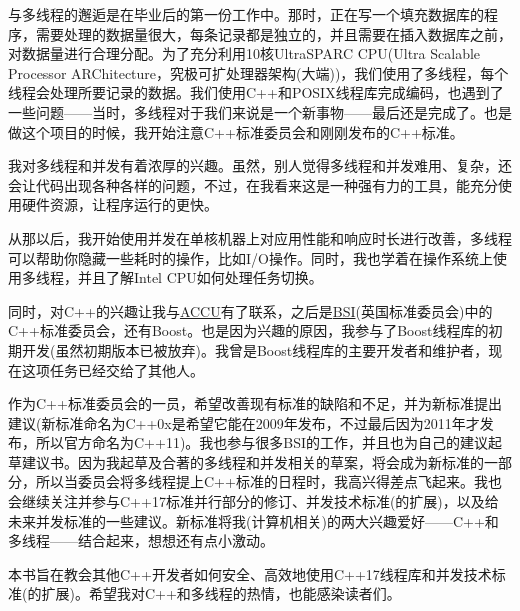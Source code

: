 
与多线程的邂逅是在毕业后的第一份工作中。那时，正在写一个填充数据库的程序，需要处理的数据量很大，每条记录都是独立的，并且需要在插入数据库之前，对数据量进行合理分配。为了充分利用10核UltraSPARC CPU(Ultra Scalable Processor ARChitecture，究极可扩处理器架构(大端))，我们使用了多线程，每个线程会处理所要记录的数据。我们使用C++和POSIX线程库完成编码，也遇到了一些问题——当时，多线程对于我们来说是一个新事物——最后还是完成了。也是做这个项目的时候，我开始注意C++标准委员会和刚刚发布的C++标准。

我对多线程和并发有着浓厚的兴趣。虽然，别人觉得多线程和并发难用、复杂，还会让代码出现各种各样的问题，不过，在我看来这是一种强有力的工具，能充分使用硬件资源，让程序运行的更快。

从那以后，我开始使用并发在单核机器上对应用性能和响应时长进行改善，多线程可以帮助你隐藏一些耗时的操作，比如I/O操作。同时，我也学着在操作系统上使用多线程，并且了解Intel CPU如何处理任务切换。

同时，对C++的兴趣让我与\href{http://accu.org/}{ACCU}有了联系，之后是\href{http://www.bsigroup.com/en-GB/standards/}{BSI}(英国标准委员会)中的C++标准委员会，还有Boost。也是因为兴趣的原因，我参与了Boost线程库的初期开发(虽然初期版本已被放弃)。我曾是Boost线程库的主要开发者和维护者，现在这项任务已经交给了其他人。

作为C++标准委员会的一员，希望改善现有标准的缺陷和不足，并为新标准提出建议(新标准命名为C++0x是希望它能在2009年发布，不过最后因为2011年才发布，所以官方命名为C++11)。我也参与很多BSI的工作，并且也为自己的建议起草建议书。因为我起草及合著的多线程和并发相关的草案，将会成为新标准的一部分，所以当委员会将多线程提上C++标准的日程时，我高兴得差点飞起来。我也会继续关注并参与C++17标准并行部分的修订、并发技术标准(的扩展)，以及给未来并发标准的一些建议。新标准将我(计算机相关)的两大兴趣爱好——C++和多线程——结合起来，想想还有点小激动。

本书旨在教会其他C++开发者如何安全、高效地使用C++17线程库和并发技术标准(的扩展)。希望我对C++和多线程的热情，也能感染读者们。